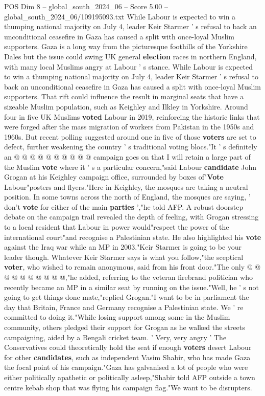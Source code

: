 \begin{textsample}{POS Dim 8 – global\_south\_2024\_06 – Score 5.00 – global\_south\_2024\_06/109195093.txt}  \label{ex:f8_pos_216}
While Labour is expected to win a thumping national majority on July 4, leader Keir Starmer ' s refusal to back an unconditional ceasefire in Gaza has caused a split with once-loyal Muslim supporters.
Gaza is a long way from the picturesque foothills of the Yorkshire Dales but the issue could swing UK general \textbf{election} races in northern England, with many local Muslims angry at Labour ' s stance.
While Labour is expected to win a thumping national majority on July 4, leader Keir Starmer ' s refusal to back an unconditional ceasefire in Gaza has caused a split with once-loyal Muslim supporters.
That rift could influence the result in marginal seats that have a sizeable Muslim population, such as Keighley and Ilkley in Yorkshire.
Around four in five UK Muslims \textbf{voted} Labour in 2019, reinforcing the historic links that were forged after the mass migration of workers from Pakistan in the 1950s and 1960s.
But recent polling suggested around one in five of those \textbf{voters} are set to defect, further weakening the country ' s traditional voting blocs."It ' s definitely an @ @ @ @ @ @ @ @ @ @ campaign goes on that I will retain a large part of the Muslim \textbf{vote} where it ' s a particular concern,"said Labour \textbf{candidate} John Grogan at his Keighley campaign office, surrounded by boxes of"\textbf{Vote} Labour"posters and flyers."Here in Keighley, the mosques are taking a neutral position.
In some towns across the north of England, the mosques are saying, ' don't \textbf{vote} for either of the main \textbf{parties} ',"he told AFP.
A robust doorstep debate on the campaign trail revealed the depth of feeling, with Grogan stressing to a local resident that Labour in power would"respect the power of the international court"and recognise a Palestinian state.
He also highlighted his \textbf{vote} against the Iraq war while an MP in 2003."Keir Starmer is going to be your leader though.
Whatever Keir Starmer says is what you follow,"the sceptical \textbf{voter}, who wished to remain anonymous, said from his front door."The only @ @ @ @ @ @ @ @ @ @,"he added, referring to the veteran firebrand politician who recently became an MP in a similar seat by running on the issue."Well, he ' s not going to get things done mate,"replied Grogan."I want to be in parliament the day that Britain, France and Germany recognise a Palestinian state.
We ' re committed to doing it."While losing support among some in the Muslim community, others pledged their support for Grogan as he walked the streets campaigning, aided by a Bengali cricket team. ' Very, very angry ' The Conservatives could theoretically hold the seat if enough \textbf{voters} desert Labour for other \textbf{candidates}, such as independent Vasim Shabir, who has made Gaza the focal point of his campaign."Gaza has galvanised a lot of people who were either politically apathetic or politically asleep,"Shabir told AFP outside a town centre kebab shop that was flying his campaign flag."We want to be disrupters.

\end{textsample}
